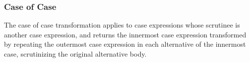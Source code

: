 \documentclass[acmsmall, screen, review]{acmart}
\begin{document}




% 

\subsubsection{Case of Case}

The case of case transformation applies to case expressions whose scrutinee is
another case expression, and returns the innermost case expression transformed by repeating
the outermost case expression in each alternative of the innermost case,
scrutinizing the original alternative body.
\end{document}
